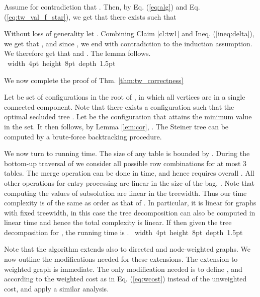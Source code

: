 \documentclass[12pt]{article}
\def\Proof{\par\noindent{\bf Proof:~}}
\def\blackslug{\hbox{\hskip 1pt \vrule width 4pt height 8pt
    depth 1.5pt \hskip 1pt}}
\def\QED{\quad\blackslug\lower 8.5pt\null\par}
\begin{document}
Assume for contradiction that . Then, by
Eq. (\ref{eq:alg}) and Eq. (\ref{eq:tw_val_f_star}), we get that
there exists  such that

Without loss of generality let .
Combining Claim \ref{cl:tw1} and Ineq. (\ref{ineq:delta}), we get that , and since , we end with contradiction to the induction assumption.
We therefore get that  and . The lemma follows.
\QED
We now complete the proof of Thm. \ref{thm:tw_correctness}
\Proof
Let  be set of configurations in the root  of , in which all vertices are in a single connected component. Note that there exists a configuration 
such that the optimal secluded tree .  Let   be the configuration that attains the minimum value  in the set. It then follows, by Lemma \ref{lem:cor}, .
The Steiner tree can be computed by a brute-force backtracking procedure.
\par We now turn to running time.
The size of any table  is bounded by .
During the bottom-up traversal of  we consider all possible row combinations for at most 3 tables. The merge operation can be done in  time, and hence requires overall . All other operations for entry processing  are linear in the size of the bag, .
Note that computing the values of subsolution  are linear in the treewidth. Thus our time complexity is of the same as order as that of \cite{ChimaniMZ11}. In particular, it is linear for graphs with fixed treewidth, in this case the tree decomposition can also be computed in linear time and hence the total complexity is linear. If  then given the tree decomposition  for , the running time is .
\QED

Note that the algorithm extends also to directed and node-weighted graphs.
We now outline the modifications needed for these extensions.
The extension to weighted graph is immediate. The only modification needed
is to
define ,  and 
according to the weighted cost as in Eq. (\ref{eq:wcost})
instead of the unweighted cost,
and apply a similar analysis.
\end{document}
